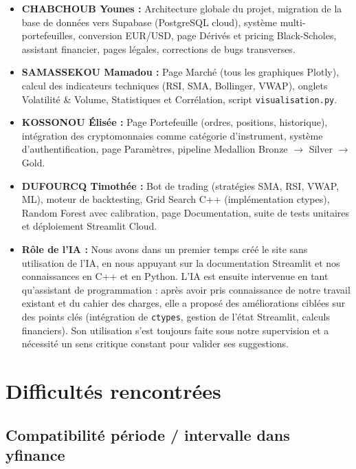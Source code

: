 \documentclass[a4paper, 12pt, twoside]{article}
\begin{document}
\begin{itemize}
    \item \textbf{CHABCHOUB Younes :} Architecture globale du projet,
          migration de la base de données vers Supabase (PostgreSQL
          cloud), système multi-portefeuilles, conversion EUR/USD, page
          Dérivés et pricing Black-Scholes, assistant financier, pages
          légales, corrections de bugs transverses.
    \item \textbf{SAMASSEKOU Mamadou :} Page Marché (tous les graphiques
          Plotly), calcul des indicateurs techniques (RSI, SMA, Bollinger,
          VWAP), onglets Volatilité \& Volume, Statistiques et
          Corrélation, script \texttt{visualisation.py}.
    \item \textbf{KOSSONOU Élisée :} Page Portefeuille (ordres,
          positions, historique), intégration des cryptomonnaies comme
          catégorie d'instrument, système d'authentification, page
          Paramètres, pipeline Medallion Bronze $\to$ Silver $\to$ Gold.
    \item \textbf{DUFOURCQ Timothée :} Bot de trading (stratégies SMA,
          RSI, VWAP, ML), moteur de backtesting, Grid Search C++
          (implémentation ctypes), Random Forest avec calibration, page
          Documentation, suite de tests unitaires et déploiement
          Streamlit Cloud.
    \item \textbf{Rôle de l'IA :} Nous avons dans un premier temps créé
          le site sans utilisation de l'IA, en nous appuyant sur la
          documentation Streamlit et nos connaissances en C++ et en
          Python. L'IA est ensuite intervenue en tant qu'assistant de
          programmation : après avoir pris connaissance de notre travail
          existant et du cahier des charges, elle a proposé des
          améliorations ciblées sur des points clés (intégration de
          \texttt{ctypes}, gestion de l'état Streamlit, calculs
          financiers). Son utilisation s'est toujours faite sous notre
          supervision et a nécessité un sens critique constant pour
          valider ses suggestions.
\end{itemize}

\section{Difficultés rencontrées}

\subsection{Compatibilité période / intervalle dans yfinance}
\end{document}
